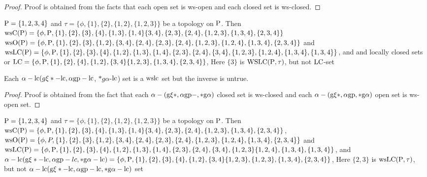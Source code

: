 \begin{proof}
Proof is obtained from the facts that each open set is ws-open and each closed set is ws-closed.
\end{proof}

\begin{exm}\label{exam6.2.13}
$\mathrm{P} = \{1, 2, 3, 4\}$ and $\tau = \{\phi, \{1\}, \{2\}, \{1, 2\}, \{1,2,3\}\}$ be a topology on $\mathrm{P}$. Then $\ws\TSC(\TSP) =\{\phi, \TSP, \{1\}, \{2\}, \{3\}, \{4\}, \{1,3\}, \{1, 4\} \{3,4\}, \{2,3\}, \{2,4\},\break \{1,2,3\},\{1,3,4\},\{2,3,4\}\}$ $\ws\TSO(\TSP) = \{\phi, \TSP, \{1\}, \{2\}, \{3\},\{1,2\}, \{3,4\}, \{2,4\}, \{2,3\},\break \{2,4\}, \{1,2,3\},\{1,2,4\},\{1,3,4\},\{2,3,4\}\}$ and $\ws\LC(\TSP)= \{\phi, \TSP ,\{1\}, \{2\}, \{3\},\{4\},\break \{1,2\},\{1,3\}, \{1,4\}, \{2,3\},\{2,4\},\{3,4\}, \{1,2,3\}, \{1,2,4\}, \{1,3,4\}, \{1,3,4\}\}$, and and locally closed sets or $\mathrm{LC} = \{\phi, \mathrm{P}, \{1\},\{2\}, \{4\}, \{1,2\}, \{3, 4\} \{1,2,3\},\{1,3,4\},\{2,3,4\}\}$, Here $\{3\}$ is $\mathrm{WSLC} (\mathrm{P}, \tau)$, but not $\mathrm{LC}$-set
\end{exm}

\begin{thm}\label{thm6.2.14}
Each $\alpha - \mathrm{lc}(g\xi * -\mathrm{lc}, \alpha \mathrm{gp}-\mathrm{lc}$, $*g\alpha$-$\mathrm{lc}$) set is a $\mathrm{wslc}$ set but the inverse is untrue.
\end{thm}

\begin{proof}
Proof is obtained from the fact that each $\alpha-(\mathrm{g}\xi *, \alpha \mathrm{gp}-, *\mathrm{g}\alpha)$ closed set is ws-closed and each $\alpha -(\mathrm{g}\xi* , \alpha\mathrm{gp}, *\mathrm{g}\alpha)$ open set is ws-open set.
\end{proof}

\begin{exm}\label{exam6.2.15}
$\mathrm{P} = \{1, 2, 3, 4\}$ and $\tau = \{\phi, \{1\}, \{2\}, \{1, 2\}, \{1,2,3\}\}$ be a topology on $\mathrm{P}$. Then $\ws\TSC(\TSP) = \{\phi, \TSP,\{1\}, \{2\}, \{3\}, \{4\}, \{1,3\}, \{1, 4\} \{3,4\}, \{2,3\}, \{2,4\},\break \{1,2,3\},\{1,3,4\},\{2,3,4\}\}$, $\ws\TSO(\TSP)=\{\phi,P,\{1\},\{2\},\{3\},\{1,2\},\{3,4\},\{2,4\},\{2,3\},\break \{2,4\},\{1,2,3\}, \{1,2,4\},\{1,3,4\},\{2,3,4\}\}$ and $\ws\LC(\TSP)= \{\phi, \TSP ,\{1\}, \{2\}, \{3\},\{4\},\break \{1,2\},\{1,3\}, \{1,4\}, \{2,3\},\{2,4\},\{3,4\}, \{1,2,3\}\{1,2,4\},\{1,3,4\},\{1,3,4\}\}$, and $\alpha - \lc(\TSg\xi * -\lc, \alpha \gp-lc, *\TSg\alpha-\lc) = \{\phi, \TSP, \{1\},\{2\}, \{3\}, \{4\}, \{1,2\}, \{3, 4\} \{1,2,3\},\{1,2,3\},\break \{1,3,4\},\{2,3,4\}\}$, Here $\{2,3\}$ is $\mathrm{ws}\mathrm{LC} (\mathrm{P}, \tau)$, but not $\alpha - \mathrm{lc}(\mathrm{g}\xi * -\mathrm{lc}, \alpha\mathrm{gp}-\mathrm{lc}, *\mathrm{g}\alpha-\mathrm{lc})$ set
\end{exm}


